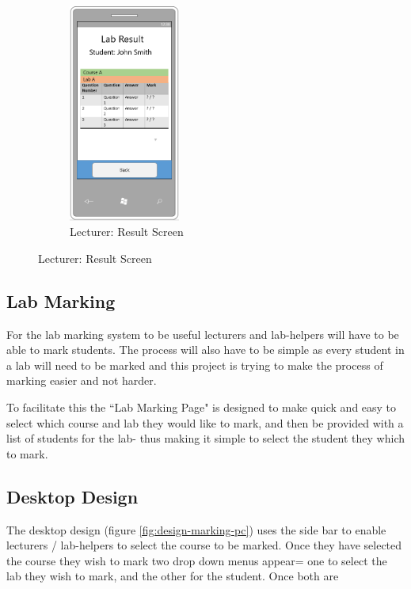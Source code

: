 \documentclass[11pt]{report}
\begin{document}
\begin{figure}[H]
\begin{subfigure}[c]{0.3\textwidth}
    \label{fig:design-result-select-mb}
\end{subfigure}
\hfill
\begin{subfigure}[c]{0.3\textwidth}
    \centering
    \includegraphics[width=0.4\textwidth]{images/design/result-lecturer-mobile.png}
    \caption{Lecturer: Result Screen}
    \label{fig:design-result-lecturer-mb}
\end{subfigure}
\end{figure}




\subsection{Lab Marking}
For the lab marking system to be useful lecturers and lab-helpers will have to be able to mark students. The process will also have to be simple as every student in a lab will need to be marked and this project is trying to make the process of marking easier and not harder. 

To facilitate this the ``Lab Marking Page" is designed to make quick and easy to select which course and lab they would like to mark, and then be provided with a list of students for the lab- thus making it simple to select the student they which to mark.

\subsection*{Desktop Design}

The desktop design (figure \ref{fig:design-marking-pc}) uses the side bar to enable lecturers / lab-helpers to select the course to be marked. Once they have selected the course they wish to mark two drop down menus appear= one to select the lab they wish to mark,  and the other for the student. Once both are 
\end{document}
